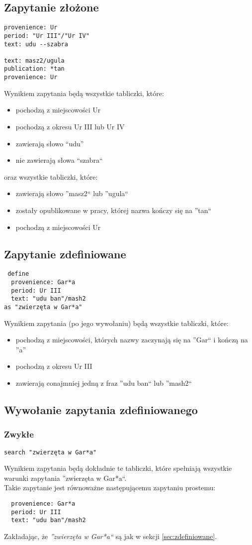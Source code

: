 \subsection{Zapytanie złożone}
\begin{verbatim}
provenience: Ur
period: "Ur III"/"Ur IV"
text: udu --szabra

text: masz2/ugula
publication: *tan
provenience: Ur
\end{verbatim}
Wynikiem zapytania będą wszystkie tabliczki, które:
\begin{itemize}
 \item pochodzą z miejscowości Ur
 \item pochodzą z okresu Ur III lub Ur IV
 \item zawierają słowo ``udu''
 \item nie zawierają słowa ``szabra``
\end{itemize}
oraz wszystkie tabliczki, które:
\begin{itemize}
 \item zawierają słowo ''masz2`` lub ''ugula``
 \item zostały opublikowane w pracy, której nazwa kończy się na ''tan``
 \item pochodzą z miejscowości Ur
\end{itemize}


\subsection{\label{sec:zdefiniowane} Zapytanie zdefiniowane}
\begin{verbatim}
 define
  provenience: Gar*a
  period: Ur III
  text: "udu ban"/mash2
as "zwierzęta w Gar*a"
\end{verbatim}
Wynikiem zapytania (po jego wywołaniu) będą wszystkie tabliczki, które:
\begin{itemize}
\item pochodzą z miejscowości, których nazwy zaczynają się na ''Gar`` i kończą na ''a''
\item pochodzą z okresu Ur III
\item zawierają conajmniej jedną z fraz ''udu ban`` lub ''mash2``
\end{itemize}

\subsection{Wywołanie zapytania zdefiniowanego}
\subsubsection{Zwykłe}
\begin{verbatim}
search "zwierzęta w Gar*a"
\end{verbatim}
Wynikiem zapytania będą dokładnie te tabliczki, które spełniają wszystkie warunki zapytania ''zwierzęta w Gar*a``.\\
Takie zapytanie jest równoważne następującemu zapytaniu prostemu:
\begin{verbatim}
  provenience: Gar*a
  period: Ur III
  text: "udu ban"/mash2
\end{verbatim}
Zakładając, że \textit{''zwierzęta w Gar*a``} są jak w sekcji \ref{sec:zdefiniowane}.
